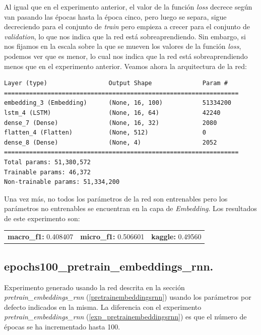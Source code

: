 \documentclass[11pt]{article}
\begin{document}
Al igual que en el experimento anterior, el valor de la función \textit{loss} decrece según van pasando las épocas hasta la época cinco, pero luego se separa, sigue decreciendo para el conjunto de \textit{train} pero empieza a crecer para el conjunto de \textit{validation}, lo que nos indica que la red está sobreaprendiendo. Sin embargo, si nos fijamos en la escala sobre la que se mueven los valores de la función \textit{loss}, podemos ver que es menor, lo cual nos indica que la red está sobreaprendiendo menos que en el experimento anterior. Veamos ahora la arquitectura de la red:

\begin{verbatim}
Layer (type)                 Output Shape              Param #   
=================================================================
embedding_3 (Embedding)      (None, 16, 100)           51334200  
lstm_4 (LSTM)                (None, 16, 64)            42240     
dense_7 (Dense)              (None, 16, 32)            2080      
flatten_4 (Flatten)          (None, 512)               0         
dense_8 (Dense)              (None, 4)                 2052      
=================================================================
Total params: 51,380,572
Trainable params: 46,372
Non-trainable params: 51,334,200
\end{verbatim}

Una vez más, no todos los parámetros de la red son entrenables pero los parámetros no entrenables se encuentran en la capa de \textit{Embedding}. Los resultados de este experimento son: 

\begin{table}[H]
\begin{tabular}{c|c|c}
\textbf{macro\_f1:} 0.408407 & \textbf{micro\_f1:} 0.506601 & \textbf{kaggle:} 0.49560
\end{tabular}
\end{table}

\subsection{epochs100\_pretrain\_embeddings\_rnn.} \label{exp_epochs100pretrainembeddingsrnn}

Experimento generado usando la red descrita en la sección \textit{pretrain\_embeddings\_rnn} (\ref{pretrainembeddingsrnn}) usando los parámetros por defecto indicados en la misma. La diferencia con el experimento \textit{pretrain\_embeddings\_rnn} (\ref{exp_pretrainembeddingsrnn}) es que el número de épocas se ha incrementado hasta 100.
\end{document}
